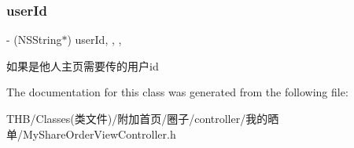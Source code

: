 \subsubsection{\texorpdfstring{user\+Id}{userId}}
{\footnotesize\ttfamily -\/ (N\+S\+String$\ast$) user\+Id\hspace{0.3cm}{\ttfamily [read]}, {\ttfamily [write]}, {\ttfamily [nonatomic]}, {\ttfamily [strong]}}

如果是他人主页需要传的用户id 

The documentation for this class was generated from the following file\+:\begin{DoxyCompactItemize}
\item 
T\+H\+B/\+Classes(类文件)/附加首页/圈子/controller/我的晒单/My\+Share\+Order\+View\+Controller.\+h\end{DoxyCompactItemize}
